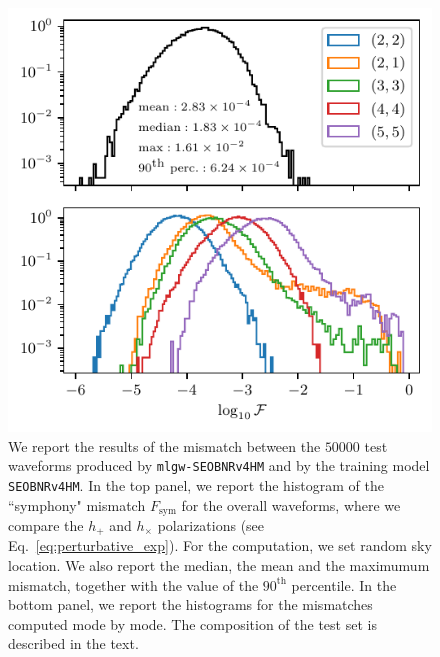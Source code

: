 \documentclass[twocolumn,showpacs,preprintnumbers,nofootinbib,prd,
superscriptaddress,10pt]{revtex4-1}
\begin{document}
\begin{figure}[t]
	\centering
	\includegraphics[scale = 1]{accuracy}
	\caption{We report the results of the mismatch between the $50000$ test waveforms produced by \texttt{mlgw-SEOBNRv4HM} and by the training model \texttt{SEOBNRv4HM}.
	In the top panel, we report the histogram of the ``symphony" mismatch $F_\text{sym}$ for the overall waveforms, where we compare the $h_+$ and $h_\times$ polarizations (see Eq.~\eqref{eq:perturbative_exp}). For the computation, we set random sky location. We also report the median, the mean and the maximumum mismatch, together with the value of the $90^\text{th}$ percentile.
	In the bottom panel, we report the histograms for the mismatches computed mode by mode.
	The composition of the test set is described in the text.
	}
	\label{fig:accuracy_hist}
\end{figure}
\end{document}
